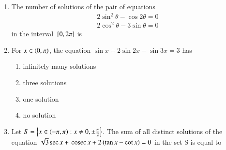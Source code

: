 \documentclass[journal,12pt,twocolumn,article]{IEEEtran}
\theoremstyle{remark}
\begin{document}
\begin{enumerate}[start = 20]
\begin{enumerate}
\end{enumerate}
\item The number of solutions of the pair of equations
\begin{align*}
2\sin^2\theta - \cos2\theta = 0\\
2\cos^2\theta - 3\sin\theta = 0
\end{align*}
in the interval ${}\left[0,2\pi\right]$ is
\hfill{}
\begin{enumerate}
\end{enumerate}
\item For $x \in \left(0,\pi\right)$, the equation $\sin x + 2\sin 2x - \sin 3x = 3$ has
\hfill{}
\begin{enumerate}
\item infinitely many solutions
\item three solutions
\item one solution
\item no solution
\end{enumerate}
\item Let $S = \left\{x \in \left(-\pi,\pi\right) : x \neq 0, \pm \frac{\pi}{2}\right\}$. The sum of all distinct solutions of the equation $\sqrt{3} \sec x + \,\text{cosec}\, x + 2\left(\tan x - \cot x\right) = 0$ in the set S is equal to
\hfill{}
\begin{enumerate}
\end{enumerate}
\end{enumerate}
\end{document}
